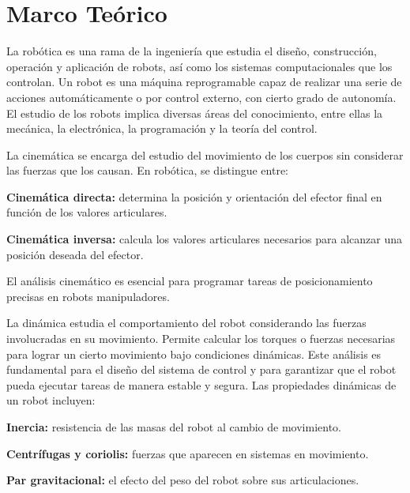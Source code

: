 \chapter{Marco Teórico} 
\label{chap:marco_teorico}

La robótica es una rama de la ingeniería que estudia el diseño, construcción, operación y aplicación de robots, así como los sistemas computacionales que los controlan. Un robot es una máquina reprogramable capaz de realizar una serie de acciones automáticamente o por control externo, con cierto grado de autonomía. El estudio de los robots implica diversas áreas del conocimiento, entre ellas la mecánica, la electrónica, la programación y la teoría del control.

La cinemática se encarga del estudio del movimiento de los cuerpos sin considerar las fuerzas que los causan. En robótica, se distingue entre:

\textbf{Cinemática directa:} determina la posición y orientación del efector final en función de los valores articulares.

\textbf{Cinemática inversa:} calcula los valores articulares necesarios para alcanzar una posición deseada del efector.


El análisis cinemático es esencial para programar tareas de posicionamiento precisas en robots manipuladores.

La dinámica estudia el comportamiento del robot considerando las fuerzas involucradas en su movimiento. Permite calcular los torques o fuerzas necesarias para lograr un cierto movimiento bajo condiciones dinámicas. Este análisis es fundamental para el diseño del sistema de control y para garantizar que el robot pueda ejecutar tareas de manera estable y segura.
Las propiedades dinámicas de un robot incluyen:

\textbf{Inercia:} resistencia de las masas del robot al cambio de movimiento.

\textbf{Centrífugas y coriolis:} fuerzas que aparecen en sistemas en movimiento.

\textbf{Par gravitacional:} el efecto del peso del robot sobre sus articulaciones.



